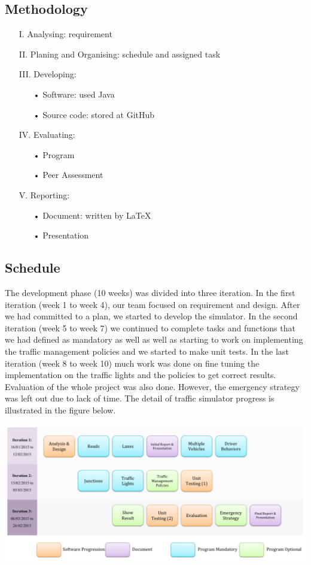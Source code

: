 \documentclass[11pt]{article}
\begin{document}
\subsection{Methodology}
\begin{itemize}
\item[I.] Analysing: requirement
\item[II.] Planing and Organising: schedule and assigned task
\item[III.] Developing:
	\begin{itemize}
	\item[•] Software: used Java
	\item[•] Source code: stored at GitHub
	\end{itemize}
\item[IV.] 	Evaluating:
	\begin{itemize}
	\item[•] Program
	\item[•] Peer Assessment
	\end{itemize}
\item[V.]  	Reporting:
	\begin{itemize}
	\item[•] Document: written by LaTeX
	\item[•] Presentation
	\end{itemize}
\end{itemize}

	\subsection{Schedule}
The development phase (10 weeks) was divided into three iteration. In the first iteration (week 1 to week 4), our team focused on requirement and design. After we had committed to a plan, we started to develop the simulator. In the second iteration (week 5 to week 7) we continued to complete tasks and functions that we had defined as mandatory as well as well as starting to work on implementing the traffic management policies and we started to make unit tests. In the last iteration (week 8 to week 10) much work was done on fine tuning the implementation on the traffic lights and the policies to get correct results. Evaluation of the whole project was also done. However, the emergency strategy was left out due to lack of time. The detail of traffic simulator progress is illustrated in the figure below.      
\begin{center}			
\includegraphics[scale = 0.40]{Figure01}
\end{center}
\end{document}
